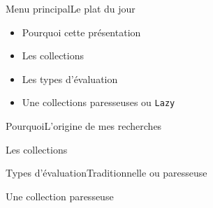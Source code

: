 





\begin{frame}[plain]
	\titlepage{}
\end{frame}

\newcommand\blankfootnote[1]{%
  \let\thefootnote\relax\footnotetext{#1}%
  \let\thefootnote\svthefootnote%
}

\begin{frame}{Menu principal}{Le plat du jour}
    \begin{itemize}
        \item Pourquoi cette présentation
        \item Les collections
        \item Les types d'évaluation
        \item Une collections paresseuses ou \texttt{Lazy}
    \end{itemize}
\end{frame}

\begin{frameD}{Pourquoi}{L'origine de mes recherches}

\end{frameD}



\begin{frameD}{Les collections}

\end{frameD}



\begin{frameD}{Types d'évaluation}{Traditionnelle ou paresseuse}

\end{frameD}



\begin{frameD}{Une collection paresseuse}

\end{frameD}



